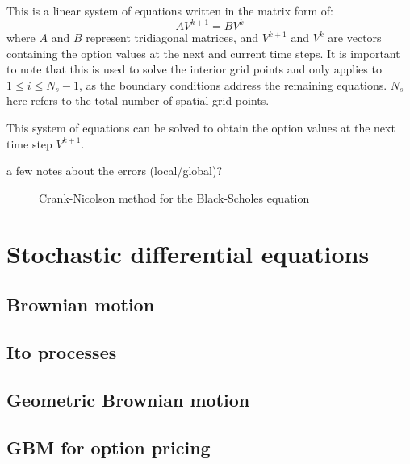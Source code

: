 This is a linear system of equations written in the matrix form of:
\[
    AV^{k+1} = BV^{k}
\]
where $A$ and $B$ represent tridiagonal matrices, and $V^{k+1}$ and $V^{k}$ are vectors containing the option values at the next and current time steps. It is important to note that this is used to solve the interior grid points and only applies to $1 \leq i \leq N_s - 1$, as the boundary conditions address the remaining equations. $N_s$ here refers to the total number of spatial grid points.

This system of equations can be solved to obtain the option values at the next time step $V^{k+1}$.

{\color{red} a few notes about the errors (local/global)?}

\begin{figure}[H]
    \centering
    \caption{Crank-Nicolson method for the Black-Scholes equation}
    \label{fig:bse-cn}
\end{figure}


\section{Stochastic differential equations}
\subsection{Brownian motion}
\subsection{Ito processes}
\subsection{Geometric Brownian motion}
\subsection{GBM for option pricing}

